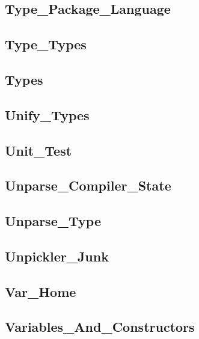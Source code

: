\subsection{Type\_Package\_Language}			
\subsection{Type\_Types}				
\subsection{Types}					
\subsection{Unify\_Types}				
\subsection{Unit\_Test}					
\subsection{Unparse\_Compiler\_State}			
\subsection{Unparse\_Type}				
\subsection{Unpickler\_Junk}				
\subsection{Var\_Home}					
\subsection{Variables\_And\_Constructors}		


